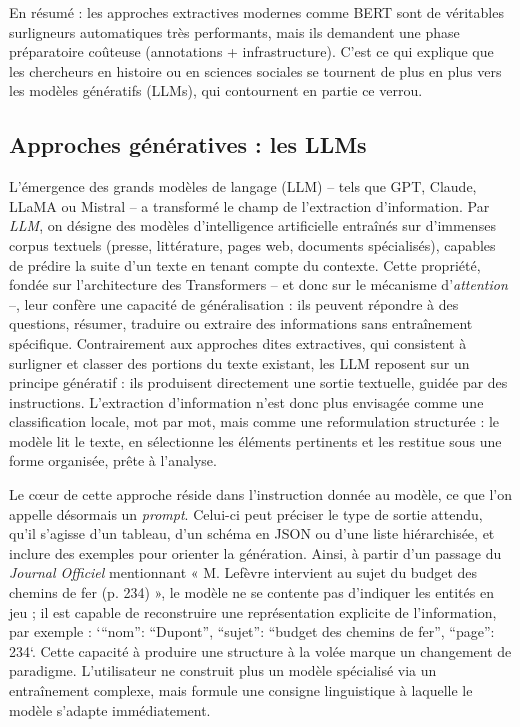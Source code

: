 En résumé : les approches extractives modernes comme BERT sont de véritables surligneurs automatiques très performants, mais ils demandent une phase préparatoire coûteuse (annotations + infrastructure). C’est ce qui explique que les chercheurs en histoire ou en sciences sociales se tournent de plus en plus vers les modèles génératifs (LLMs), qui contournent en partie ce verrou.

\subsection{Approches génératives : les LLMs}

L’émergence des grands modèles de langage (LLM) -- tels que GPT, Claude, LLaMA ou Mistral – a transformé le champ de l’extraction d’information. Par \emph{LLM}, on désigne des modèles d’intelligence artificielle entraînés sur d’immenses corpus textuels (presse, littérature, pages web, documents spécialisés), capables de prédire la suite d’un texte en tenant compte du contexte. Cette propriété, fondée sur l’architecture des Transformers -- et donc sur le mécanisme d'\emph{attention} --, leur confère une capacité de généralisation : ils peuvent répondre à des questions, résumer, traduire ou extraire des informations sans entraînement spécifique. Contrairement aux approches dites extractives, qui consistent à surligner et classer des portions du texte existant, les LLM reposent sur un principe génératif : ils produisent directement une sortie textuelle, guidée par des instructions. L’extraction d’information n’est donc plus envisagée comme une classification locale, mot par mot, mais comme une reformulation structurée : le modèle lit le texte, en sélectionne les éléments pertinents et les restitue sous une forme organisée, prête à l’analyse.

Le cœur de cette approche réside dans l’instruction donnée au modèle, ce que l’on appelle désormais un \emph{prompt}. Celui-ci peut préciser le type de sortie attendu, qu’il s’agisse d’un tableau, d’un schéma en JSON ou d’une liste hiérarchisée, et inclure des exemples pour orienter la génération. Ainsi, à partir d’un passage du \emph{Journal Officiel} mentionnant « M. Lefèvre intervient au sujet du budget des chemins de fer (p. 234) », le modèle ne se contente pas d’indiquer les entités en jeu ; il est capable de reconstruire une représentation explicite de l’information, par exemple : `{\enquote{nom}: \enquote{Dupont}, \enquote{sujet}: \enquote{budget des chemins de fer}, \enquote{page}: 234}`. Cette capacité à produire une structure à la volée marque un changement de paradigme. L’utilisateur ne construit plus un modèle spécialisé via un entraînement complexe, mais formule une consigne linguistique à laquelle le modèle s’adapte immédiatement.

